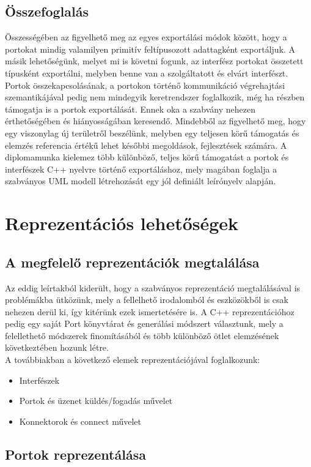 \documentclass[a4paper,12pt]{report}
\begin{document}
\section{Összefoglalás}
Összességében az figyelhető meg az egyes exportálási módok között, hogy a portokat mindig valamilyen primitív feltípusozott adattagként exportáljuk. A másik lehetőségünk, melyet mi is követni fogunk, az interfész portokat összetett típusként exportálni, melyben benne van a szolgáltatott és elvárt interfészt. Portok összekapcsolásának, a portokon történő kommunikáció végrehajtási szemantikájával pedig nem mindegyik keretrendszer foglalkozik, még ha részben támogatja is a portok exportálását. Ennek oka a szabvány nehezen érthetőségében és hiányosságában keresendő. Mindebből az figyelhető meg, hogy egy viszonylag új területről beszélünk, melyben egy teljesen körű támogatás és elemzés referencia értékű lehet későbbi megoldások, fejlesztések számára. A diplomamunka kielemez több különböző, teljes körű támogatást a portok és interfészek C++ nyelvre történő exportáláshoz, mely magában foglalja a szabványos UML modell létrehozását egy jól definiált leírónyelv alapján.

\chapter{Reprezentációs lehetőségek}
\section{A megfelelő reprezentációk megtalálása}
Az eddig leírtakból kiderült, hogy a szabványos reprezentáció megtalálásával is problémákba ütközünk, mely a fellelhető irodalomból és eszközökből is csak nehezen derül ki, így kitérünk ezek ismertetésére is. A C++ reprezentációhoz pedig egy saját Port könyvtárat és generálási módszert választunk, mely a felellethető módszerek finomításából és több különböző ötlet elemzésének következtében hozunk létre. \\

A továbbiakban a következő elemek reprezentációjával foglalkozunk:
\begin{itemize}
\item Interfészek
\item Portok és üzenet küldés/fogadás művelet
\item Konnektorok és connect művelet
\end{itemize}

\section{Portok reprezentálása}
\end{document}
